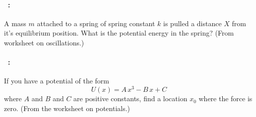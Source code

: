 \documentclass[12pt]{article} 
\begin{document}
\vfill

\paragraph{\problemname~\theproblem:}%
A mass $m$ attached to a spring of spring constant $k$ is pulled a distance $X$
from it's equilibrium position. What is the potential energy in the
spring? (From worksheet on oscillations.)

\vfill

\paragraph{\problemname~\theproblem:}%
If you have a potential of the form
$$
U(x) = A\,x^3 - B\,x + C
$$ where $A$ and $B$ and $C$ are positive constants, find a location $x_0$ where
the force is zero. (From the worksheet on potentials.)

\vfill
~
\end{document}
